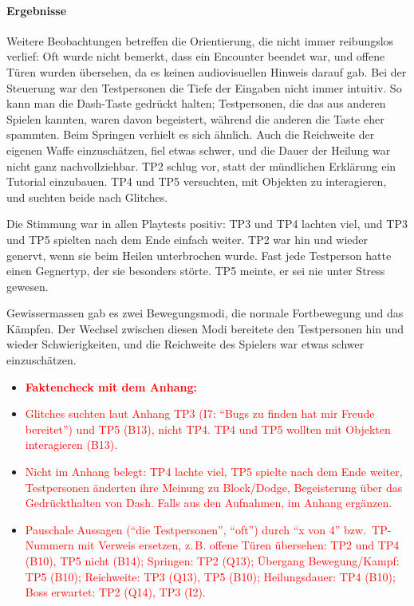 \documentclass[../Main.tex]{subfiles}
\begin{document}
\paragraph{Ergebnisse}
Weitere Beobachtungen betreffen die Orientierung, die nicht immer reibungslos verlief: Oft wurde nicht bemerkt, dass ein Encounter beendet war, und offene Türen wurden übersehen, da es keinen audiovisuellen Hinweis darauf gab. Bei der Steuerung war den Testpersonen die Tiefe der Eingaben nicht immer intuitiv. So kann man die Dash-Taste gedrückt halten; Testpersonen, die das aus anderen Spielen kannten, waren davon begeistert, während die anderen die Taste eher spammten. Beim Springen verhielt es sich ähnlich. Auch die Reichweite der eigenen Waffe einzuschätzen, fiel etwas schwer, und die Dauer der Heilung war nicht ganz nachvollziehbar. TP2 schlug vor, statt der mündlichen Erklärung ein Tutorial einzubauen. TP4 und TP5 versuchten, mit Objekten zu interagieren, und suchten beide nach Glitches.

Die Stimmung war in allen Playtests positiv: TP3 und TP4 lachten viel, und TP3 und TP5 spielten nach dem Ende einfach weiter. TP2 war hin und wieder genervt, wenn sie beim Heilen unterbrochen wurde. Fast jede Testperson hatte einen Gegnertyp, der sie besonders störte. TP5 meinte, er sei nie unter Stress gewesen.

Gewissermassen gab es zwei Bewegungsmodi, die normale Fortbewegung und das Kämpfen. Der Wechsel zwischen diesen Modi bereitete den Testpersonen hin und wieder Schwierigkeiten, und die Reichweite des Spielers war etwas schwer einzuschätzen.

\begin{itemize}[leftmargin=1.5cm]
    \item \textcolor{red}{\textbf{Faktencheck mit dem Anhang:}}
    \item \textcolor{red}{Glitches suchten laut Anhang TP3 (I7: \enquote{Bugs zu finden hat mir Freude bereitet}) und TP5 (B13), nicht TP4. TP4 und TP5 wollten mit Objekten interagieren (B13).}
    \item \textcolor{red}{Nicht im Anhang belegt: TP4 lachte viel, TP5 spielte nach dem Ende weiter, Testpersonen änderten ihre Meinung zu Block/Dodge, Begeisterung über das Gedrückthalten von Dash. Falls aus den Aufnahmen, im Anhang ergänzen.}
    \item \textcolor{red}{Pauschale Aussagen (\enquote{die Testpersonen}, \enquote{oft}) durch \enquote{x von 4} bzw.\ TP-Nummern mit Verweis ersetzen, z.\,B. offene Türen übersehen: TP2 und TP4 (B10), TP5 nicht (B14); Springen: TP2 (Q13); Übergang Bewegung/Kampf: TP5 (B10); Reichweite: TP3 (Q13), TP5 (B10); Heilungsdauer: TP4 (B10); Boss erwartet: TP2 (Q14), TP3 (I2).}
\end{itemize}
\end{document}

